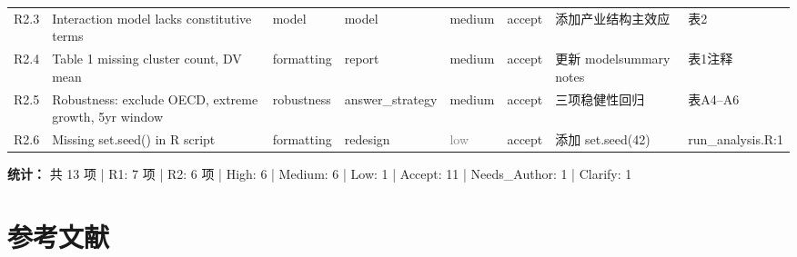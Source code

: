 \documentclass[12pt,a4paper]{ctexart}
\newcommand{\cellsevmed}{\cellcolor{orange!10}\textcolor{orange!70!black}}
\newcommand{\cellsevlow}{\cellcolor{gray!10}\textcolor{gray}}
\newcommand{\cellacc}{\cellcolor{green!10}\textcolor{green!60!black}}
\begin{document}
\begin{longtable}{p{1.1cm}p{2.8cm}p{1.3cm}p{1.2cm}p{0.8cm}p{1.5cm}p{3.0cm}p{1.2cm}}
R2.3 & Interaction model lacks constitutive terms & model & model & \cellsevmed{medium} & \cellacc{accept} & 添加产业结构主效应 & 表2 \\
R2.4 & Table 1 missing cluster count, DV mean & formatting & report & \cellsevmed{medium} & \cellacc{accept} & 更新 modelsummary notes & 表1注释 \\
R2.5 & Robustness: exclude OECD, extreme growth, 5yr window & robustness & answer\_strategy & \cellsevmed{medium} & \cellacc{accept} & 三项稳健性回归 & 表A4--A6 \\
R2.6 & Missing set.seed() in R script & formatting & redesign & \cellsevlow{low} & \cellacc{accept} & 添加 set.seed(42) & run\_analysis.R:1 \\

\end{longtable}
\endgroup

\vspace{8pt}
\textbf{统计：} 共 13 项 | R1: 7 项 | R2: 6 项 |
High: 6 | Medium: 6 | Low: 1 |
Accept: 11 | Needs\_Author: 1 | Clarify: 1

\newpage

\section*{参考文献}


\end{document}
